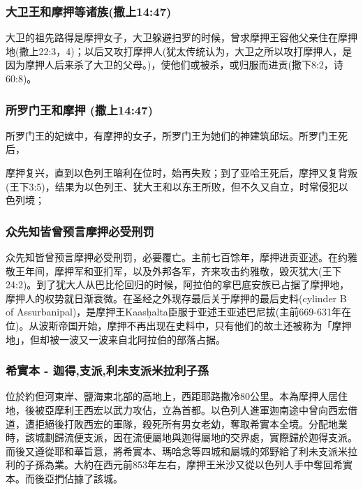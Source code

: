 \subsubsection{大卫王和摩押等诸族(撒上14:47)}
大卫的祖先路得是摩押女子，大卫躲避扫罗的时候，曾求摩押王容他父亲住在摩押地(撒上22:3，4)；以后又攻打摩押人(犹太传统认为，大卫之所以攻打摩押人，是因为摩押人后来杀了大卫的父母。)，使他们或被杀，或归服而进贡(撒下8:2，诗60:8)。


\subsubsection{所罗门王和摩押 (撒上14:47)}
所罗门王的妃嫔中，有摩押的女子，所罗门王为她们的神建筑邱坛。所罗门王死后，


摩押复兴，直到以色列王暗利在位时，始再失败；到了亚哈王死后，摩押又复背叛(王下3:5)，结果为以色列王、犹大王和以东王所败，但不久又自立，时常侵犯以色列境；

\subsubsection{众先知皆曾预言摩押必受刑罚}
众先知皆曾预言摩押必受刑罚，必要覆亡。主前七百馀年，摩押进贡亚述。在约雅敬王年间，摩押军和亚扪军，以及外邦各军，齐来攻击约雅敬，毁灭犹大(王下24:2)。到了犹大人从巴比伦回归的时候，阿拉伯的拿巴底安族已占据了摩押地，摩押人的权势就日渐衰微。在圣经之外现存最后关于摩押的最后史料(cylinder B of Assurbanipal)，是摩押王Kaasḥalta臣服于亚述王亚述巴尼拔(主前669-631年在位)。从波斯帝国开始，摩押不再出现在史料中，只有他们的故土还被称为「摩押地」，但却被一波又一波来自北阿拉伯的部落占据。

   

\subsubsection{希實本 - 迦得,支派,利未支派米拉利子孫}
位於約但河東岸、鹽海東北部的高地上，西距耶路撒冷80公里。本為摩押人居住地，後被亞摩利王西宏以武力攻佔，立為首都。以色列人進軍迦南途中曾向西宏借道，遭拒絕後打敗西宏的軍隊，殺死所有男女老幼，奪取希實本全境。分配地業時，該城劃歸流便支派，因在流便屬地與迦得屬地的交界處，實際歸於迦得支派。而後又遵從耶和華旨意，將希實本、瑪哈念等四城和屬城的郊野給了利未支派米拉利的子孫為業。大約在西元前853年左右，摩押王米沙又從以色列人手中奪回希實本。而後亞捫佔據了該城。



